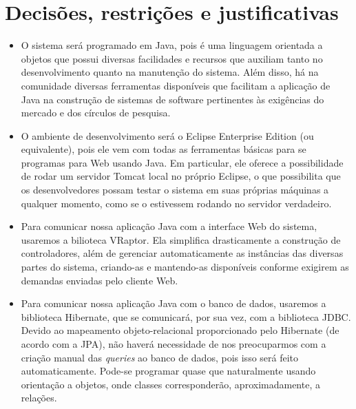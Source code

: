 \documentclass[11pt, a4paper]{article}
\begin{document}
    \section{Decisões, restrições e justificativas}
        \begin{itemize}
            \item O sistema será programado em Java, pois é uma linguagem
            orientada a objetos que possui diversas facilidades e recursos que
            auxiliam tanto no desenvolvimento quanto na manutenção do sistema.
            Além disso, há na comunidade diversas ferramentas disponíveis que
            facilitam a aplicação de Java na construção de sistemas de software
            pertinentes às exigências do mercado e dos círculos de pesquisa.
            
            \item O ambiente de desenvolvimento será o Eclipse Enterprise
            Edition (ou equivalente), pois ele vem com todas as ferramentas
            básicas para se programas para Web usando Java. Em particular, ele
            oferece a possibilidade de rodar um servidor Tomcat local no próprio
            Eclipse, o que possibilita que os desenvolvedores possam testar o
            sistema em suas próprias máquinas a qualquer momento, como se o
            estivessem rodando no servidor verdadeiro.

            \item Para comunicar nossa aplicação Java com a interface Web do
            sistema, usaremos a bilioteca VRaptor. Ela simplifica drasticamente
            a construção de controladores, além de gerenciar automaticamente as
            instâncias das diversas partes do sistema, criando-as e mantendo-as
            disponíveis conforme exigirem as demandas enviadas pelo cliente Web.

            \item Para comunicar nossa aplicação Java com o banco de dados,
            usaremos a biblioteca Hibernate, que se comunicará, por sua vez, com
            a biblioteca JDBC. Devido ao mapeamento objeto-relacional
            proporcionado pelo Hibernate (de acordo com a JPA), não haverá
            necessidade de nos preocuparmos com a criação manual das
            \textit{queries} ao banco de dados, pois isso será feito
            automaticamente. Pode-se programar quase que naturalmente usando
            orientação a objetos, onde classes corresponderão, aproximadamente,
            a relações.


\end{itemize}
\end{document}
